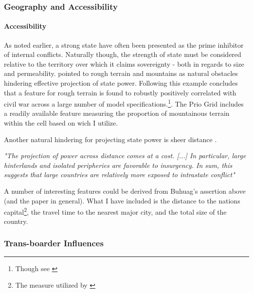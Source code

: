 \documentclass[a4paper]{article}
\begin{document}
\subsubsection{Geography and Accessibility} %

\paragraph{Accessibility} As noted earlier, a strong state have often been presented as the prime inhibitor of internal conflicts. Naturally though, the strength of state must be considered relative to the territory over which it claims sovereignty - both in regards to size and permeability. \cite{Fearon_Laitin_2003} pointed to rough terrain and mountains as natural obstacles hindering effective projection of state power. Following this example \cite{Hegre_Sambanis_2006} concludes that a feature for rough terrain is found to robustly positively correlated with civil war across a large number of model specifications.\cite[526-529]{Hegre_Sambanis_2006}\footnote{Though see \cite{Goldstone_2010}}. The Prio Grid includes a readily available feature measuring the proportion of mountainous terrain within the cell based on \cite{Blyth_2002} wich I utilize.\par

Another natural hindering for projecting state power is sheer distance \citep{Fearon_2004, Buhaug_Gates_Lujala_2009, Cederman_Buhaug_Roed_2009, Buhaug_2010}. 

\begin{displayquote}

\emph{"The projection of power across distance comes at a cost. [...] In particular, large hinterlands and isolated peripheries are favorable to insurgency. In sum, this suggests that large countries are relatively more exposed to intrastate conflict"}\cite[113-114]{Buhaug_2010}

\end{displayquote}

A number of interesting features could be derived from Buhuag's assertion above (and the paper in general). What I have included is the distance to the nations capital\footnote{The measure utilized by \cite{Buhaug_2010}}, the travel time to the nearest major city, and the total size of the country\cite{prio_code_2015}.


\subsubsection{Trans-boarder Influences} %
\end{document}
